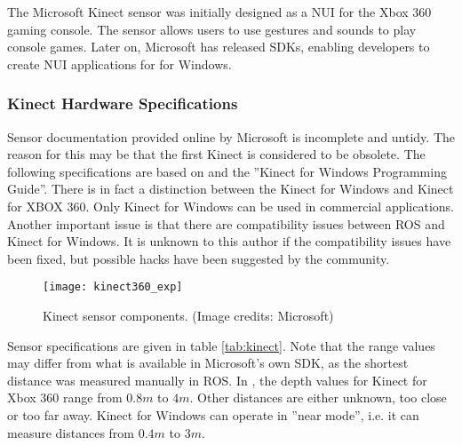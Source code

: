 The Microsoft Kinect sensor was initially designed as a \ac{NUI} for the Xbox 360 gaming console. The sensor allows users to use gestures and sounds to play console games. Later on, Microsoft has released SDKs, enabling developers to create \ac{NUI} applications for for Windows. 

\subsubsection{Kinect Hardware Specifications}

Sensor documentation provided online by Microsoft is incomplete and untidy. The reason for this may be that the first Kinect is considered to be obsolete. The following specifications are based on \cite{kinect_book} and the ''Kinect for Windows Programming Guide''\cite{kinect_guide}. There is in fact a distinction between the Kinect for Windows and Kinect for XBOX 360. Only Kinect for Windows can be used in commercial applications\cite{kinect_book}. Another important issue is that there are compatibility issues between \ac{ROS} and Kinect for Windows. It is unknown to this author if the compatibility issues have been fixed, but possible hacks have been suggested by the community\cite{kinect_discussion}\cite{kinect_hack}.

\begin{figure}[h]
    \centering
    \texttt{[image: kinect360\_exp]}
    \caption{Kinect sensor components. (Image credits: Microsoft\cite{kinect_guide})}
    \label{fig:kinect360_exp}
\end{figure}
Sensor specifications are given in table \ref{tab:kinect}. Note that the range values may differ from what is available in Microsoft's own SDK, as the shortest distance was measured manually in \ac{ROS}. In \cite{kinect_guide}, the depth values for Kinect for Xbox 360 range from $0.8 m$ to $4 m$. Other distances are either unknown, too close or too far away. Kinect for Windows can operate in ''near mode'', i.e. it can measure distances from $0.4 m$ to $3 m$.

